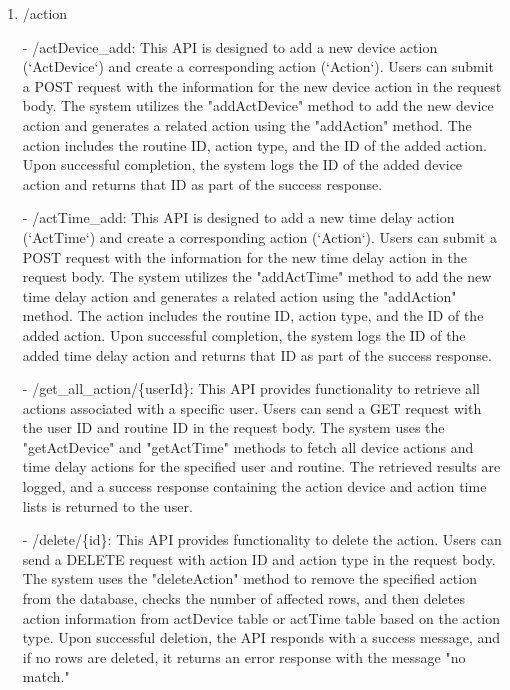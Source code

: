 \begin{enumerate}
    \item /action
    \item[-] /actDevice\_add: This API is designed to add a new device action (`ActDevice`) and create a corresponding action (`Action`). Users can submit a POST request with the information for the new device action in the request body. The system utilizes the "addActDevice" method to add the new device action and generates a related action using the "addAction" method. The action includes the routine ID, action type, and the ID of the added action. Upon successful completion, the system logs the ID of the added device action and returns that ID as part of the success response.\\
    \item[-] /actTime\_add: This API is designed to add a new time delay action (`ActTime`) and create a corresponding action (`Action`). Users can submit a POST request with the information for the new time delay action in the request body. The system utilizes the "addActTime" method to add the new time delay action and generates a related action using the "addAction" method. The action includes the routine ID, action type, and the ID of the added action. Upon successful completion, the system logs the ID of the added time delay action and returns that ID as part of the success response.\\
    \item[-] /get\_all\_action/\{userId\}: This API provides functionality to retrieve all actions associated with a specific user. Users can send a GET request with the user ID and routine ID in the request body. The system uses the "getActDevice" and "getActTime" methods to fetch all device actions and time delay actions for the specified user and routine. The retrieved results are logged, and a success response containing the action device and action time lists is returned to the user.\\
    \item[-] /delete/\{id\}: This API provides functionality to delete the action. Users can send a DELETE request with action ID and action type in the request body. The system uses the "deleteAction" method to remove the specified action from the database, checks the number of affected rows, and then deletes action information from actDevice table or actTime table based on the action type. Upon successful deletion, the API responds with a success message, and if no rows are deleted, it returns an error response with the message "no match."\\

\end{enumerate}

